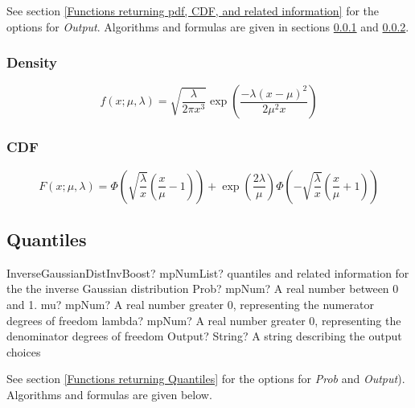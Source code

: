 \vspace{0.3cm}
See section \ref{Functions returning pdf, CDF, and related information} for the options for {\itshape\sffamily Output}. Algorithms and formulas are given in sections \ref{InverseGaussianDistributionDensity} and \ref{InverseGaussianDistributionCDF}.



\subsubsection{Density}
\label{InverseGaussianDistributionDensity}

\begin{equation} 
	f(x;\mu,\lambda)= \sqrt{\frac{\lambda}{2\pi x^3}} \exp \left( \frac{-\lambda(x-\mu)^2}{2\mu^2 x} \right)
\end{equation}


\subsubsection{CDF}
\label{InverseGaussianDistributionCDF}

\begin{equation} 
	F(x;\mu,\lambda)= \Phi\left(\sqrt{\frac{\lambda}{x}} \left(\frac{x}{\mu}-1\right)\right) +\exp \left( \frac{2\lambda}{\mu} \right) \Phi\left(-\sqrt{\frac{\lambda}{x}} \left(\frac{x}{\mu}+1\right)\right)
\end{equation}



\subsection{Quantiles}

\begin{mpFunctionsExtract}
	\mpFunctionFourNotImplemented
	{InverseGaussianDistInvBoost? mpNumList? quantiles and related information for the the inverse Gaussian distribution}
	{Prob? mpNum? A real number between 0 and 1.}
	{mu? mpNum? A real number greater 0, representing the numerator  degrees of freedom}
	{lambda? mpNum? A real number greater 0, representing the denominator degrees of freedom}
	{Output? String? A string describing the output choices}
\end{mpFunctionsExtract}

See section \ref{Functions returning Quantiles} for the options for  {\itshape\sffamily Prob} and {\itshape\sffamily Output}). Algorithms and formulas are given below.

